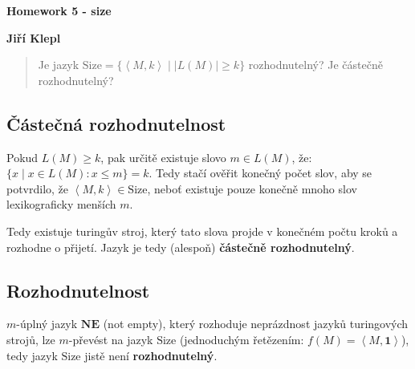 \documentclass[a4paper,12pt]{article} %
\begin{document}
\thispagestyle{empty} %

\begin{center}
    {\Large \bf Homework 5 - size}
    \vspace{2mm}

    {\bf Jiří Klepl}

\end{center}

\vspace{0.4cm}


\begin{quote}
    Je jazyk $\text{Size} = \{\left<M,k\right> \mid \left\vert L(M) \right\vert \geq k\}$ rozhodnutelný? Je částečně rozhodnutelný?
\end{quote}

\subsection*{Částečná rozhodnutelnost}

Pokud $L(M) \geq k$, pak určitě existuje slovo $m \in L(M)$, že: $\{x \mid x \in L(M): x \leq m\} = k$. Tedy stačí ověřit konečný počet slov, aby se potvrdilo, že $\left<M, k\right> \in \text{Size}$, neboť existuje pouze konečně mnoho slov lexikograficky menších $m$.

Tedy existuje turingův stroj, který tato slova projde v konečném počtu kroků a rozhodne o přijetí. Jazyk je tedy (alespoň) \textbf{částečně rozhodnutelný}.

\subsection*{Rozhodnutelnost}

$m$-úplný jazyk $\textbf{NE}$ (not empty), který rozhoduje neprázdnost jazyků turingových strojů, lze $m$-převést na jazyk $\text{Size}$ (jednoduchým řetězením: $f(M) = \left<M , \mathbf{1} \right>$), tedy jazyk $\text{Size}$ jistě není \textbf{rozhodnutelný}.
\end{document}

